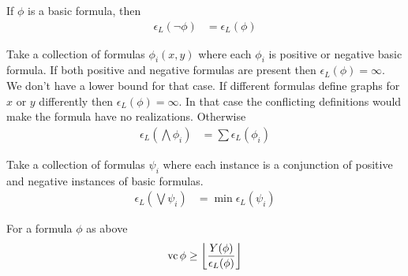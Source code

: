 \documentclass{amsart}
\providecommand{\floor}[1]{\left \lfloor #1 \right \rfloor }
\begin{document}
\begin{Definition}[Negation]
	If $\phi$ is a basic formula, then
	\begin{align*}
		\epsilon_L(\neg \phi) &= \epsilon_L(\phi)
	\end{align*}
\end{Definition}

\begin{Definition}[Conjunction]
	Take a collection of formulas $\phi_i(x, y)$ where each $\phi_i$ is positive or negative basic formula.
	If both positive and negative formulas are present then $\epsilon_L(\phi) = \infty$.
	We don't have a lower bound for that case.
	If different formulas define graphs for $x$ or $y$ differently then $\epsilon_L(\phi) = \infty$.
	In that case the conflicting definitions would make the formula have no realizations.
	Otherwise
	\begin{align*}
		\epsilon_L(\bigwedge \phi_i) &= \sum \epsilon_L(\phi_i)
	\end{align*}
\end{Definition}

\begin{Definition} [Disjunction]
	Take a collection of formulas $\psi_i$ where each instance is a conjunction of positive and negative instances of basic formulas.
	\begin{align*}
		\epsilon_L(\bigvee \psi_i) &= \min \epsilon_L(\psi_i)
	\end{align*}
\end{Definition}

\begin{Theorem}
	For a formula $\phi$ as above
	\begin{align*}
		\vc \phi \geq \floor{\frac{Y(\phi)}{\epsilon_L(\phi)}}
	\end{align*}
\end{Theorem}




\end{document}

